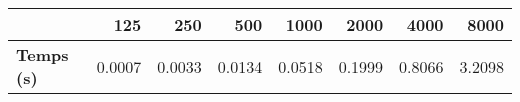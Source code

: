 \begin{tabular}{lrrrrrrr}
\toprule
{} &   125  &   250  &   500  &   1000 &   2000 &   4000 &   8000 \\
\midrule
\textbf{Temps (s)} & 0.0007 & 0.0033 & 0.0134 & 0.0518 & 0.1999 & 0.8066 & 3.2098 \\
\bottomrule
\end{tabular}
